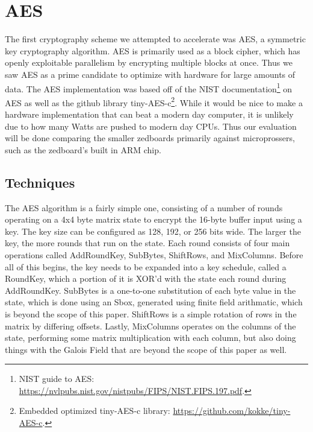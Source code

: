 \section{AES}
The first cryptography scheme we attempted to accelerate was AES, a symmetric key cryptography algorithm. AES is primarily used as a block cipher, which has openly exploitable parallelism by encrypting multiple blocks at once. Thus we saw AES as a prime candidate to optimize with hardware for large amounts of data. The AES implementation was based off of the NIST documentation\footnote{NIST guide to AES: \url{https://nvlpubs.nist.gov/nistpubs/FIPS/NIST.FIPS.197.pdf}.} on AES as well as the github library tiny-AES-c\footnote{Embedded optimized tiny-AES-c library: \url{https://github.com/kokke/tiny-AES-c}.}. While it would be nice to make a hardware implementation that can beat a modern day computer, it is unlikely due to how many Watts are pushed to modern day CPUs. Thus our evaluation will be done comparing the smaller zedboards primarily against microprossers, such as the zedboard's built in ARM chip. 

\subsection{Techniques}
The AES algorithm is a fairly simple one, consisting of a number of rounds operating on a 4x4 byte matrix state to encrypt the 16-byte buffer input using a key. The key size can be configured as 128, 192, or 256 bits wide. The larger the key, the more rounds that run on the state. Each round consists of four main operations called AddRoundKey, SubBytes, ShiftRows, and MixColumns. Before all of this begins, the key needs to be expanded into a key schedule, called a RoundKey, which a portion of it is XOR'd with the state each round during AddRoundKey. SubBytes is a one-to-one substitution of each byte value in the state, which is done using an Sbox, generated using finite field arithmatic, which is beyond the scope of this paper. ShiftRows is a simple rotation of rows in the matrix by differing offsets. Lastly, MixColumns operates on the columns of the state, performing some matrix multiplication with each column, but also doing things with the Galois Field that are beyond the scope of this paper as well.  

